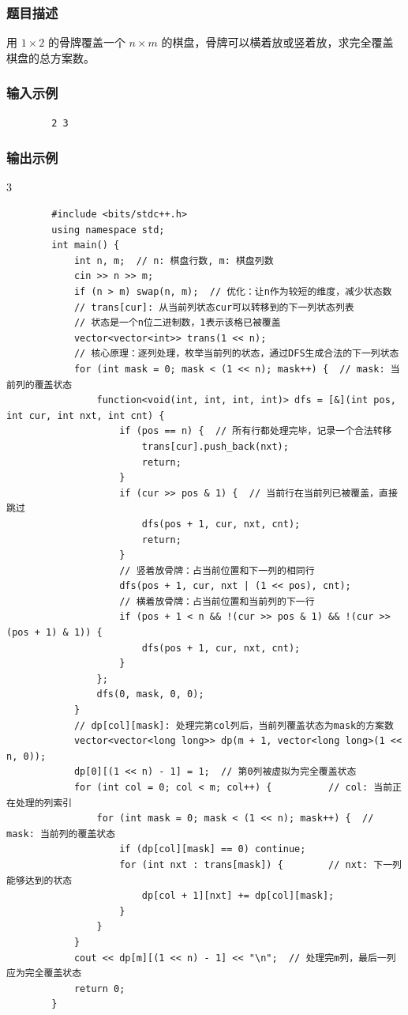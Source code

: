 \documentclass[12pt,a4paper]{ctexart}
\begin{document}
	\subsubsection*{题目描述}
	用 $1 \times 2$ 的骨牌覆盖一个 $n \times m$ 的棋盘，骨牌可以横着放或竖着放，求完全覆盖棋盘的总方案数。
	\subsubsection*{输入示例}
	\begin{verbatim}
		2 3
	\end{verbatim}
	\subsubsection*{输出示例}
	3
	\begin{lstlisting}
		#include <bits/stdc++.h>
		using namespace std;
		int main() {
			int n, m;  // n: 棋盘行数, m: 棋盘列数
			cin >> n >> m;
			if (n > m) swap(n, m);  // 优化：让n作为较短的维度，减少状态数
			// trans[cur]: 从当前列状态cur可以转移到的下一列状态列表
			// 状态是一个n位二进制数，1表示该格已被覆盖
			vector<vector<int>> trans(1 << n);
			// 核心原理：逐列处理，枚举当前列的状态，通过DFS生成合法的下一列状态
			for (int mask = 0; mask < (1 << n); mask++) {  // mask: 当前列的覆盖状态
				function<void(int, int, int, int)> dfs = [&](int pos, int cur, int nxt, int cnt) {
					if (pos == n) {  // 所有行都处理完毕，记录一个合法转移
						trans[cur].push_back(nxt);
						return;
					}
					if (cur >> pos & 1) {  // 当前行在当前列已被覆盖，直接跳过
						dfs(pos + 1, cur, nxt, cnt);
						return;
					}
					// 竖着放骨牌：占当前位置和下一列的相同行
					dfs(pos + 1, cur, nxt | (1 << pos), cnt);
					// 横着放骨牌：占当前位置和当前列的下一行
					if (pos + 1 < n && !(cur >> pos & 1) && !(cur >> (pos + 1) & 1)) {
						dfs(pos + 1, cur, nxt, cnt);
					}
				};
				dfs(0, mask, 0, 0);
			}
			// dp[col][mask]: 处理完第col列后，当前列覆盖状态为mask的方案数
			vector<vector<long long>> dp(m + 1, vector<long long>(1 << n, 0));
			dp[0][(1 << n) - 1] = 1;  // 第0列被虚拟为完全覆盖状态
			for (int col = 0; col < m; col++) {          // col: 当前正在处理的列索引
				for (int mask = 0; mask < (1 << n); mask++) {  // mask: 当前列的覆盖状态
					if (dp[col][mask] == 0) continue;
					for (int nxt : trans[mask]) {        // nxt: 下一列能够达到的状态
						dp[col + 1][nxt] += dp[col][mask];
					}
				}
			}
			cout << dp[m][(1 << n) - 1] << "\n";  // 处理完m列，最后一列应为完全覆盖状态
			return 0;
		}
	\end{lstlisting}
\end{document}
